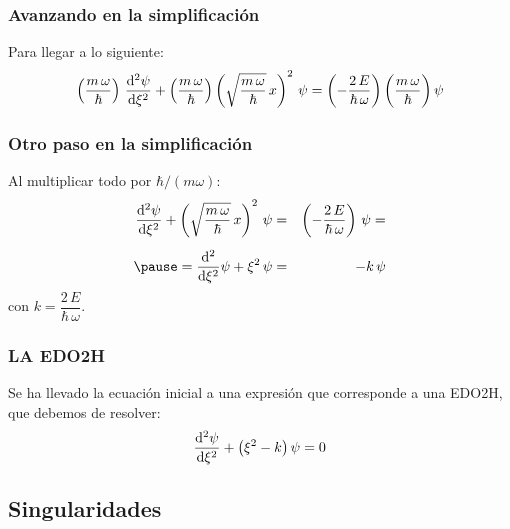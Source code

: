 \documentclass[12pt]{beamer}
\begin{document}
\begin{frame}
\frametitle{Avanzando en la simplificación}
Para llegar a lo siguiente:
\begin{align*}
\left( \dfrac{m \, \omega}{\hbar} \right) \, \dv[2]{\psi}{\xi} + \left( \dfrac{m \, \omega}{\hbar} \right) \left( \sqrt{\dfrac{m \, \omega}{\hbar}} \, x \right)^{2} \, \psi = \left( - \dfrac{2 \, E}{\hbar \, \omega} \right) \bigg( \dfrac{m \, \omega}{\hbar} \bigg) \, \psi
\end{align*}
\end{frame}
\begin{frame}
\frametitle{Otro paso en la simplificación}
Al multiplicar todo por $\hbar / (m \omega)$:
\pause
\begin{eqnarray*}
\dv[2]{\psi}{\xi} + \left( \sqrt{\dfrac{m \, \omega}{\hbar}} \, x \right)^{2} \, \psi &=& \left( - \dfrac{2 \, E}{\hbar \, \omega} \right) \, \psi = \\[0.5em] \pause
= \dv[2]{\xi} \psi + \xi^{2} \, \psi &=& - k \, \psi
\end{eqnarray*}
\pause
con $k = \dfrac{2 \, E}{\hbar \, \omega}$.
\end{frame}
\begin{frame}
\frametitle{LA EDO2H}
Se ha llevado la ecuación inicial a una expresión que corresponde a una EDO2H, que debemos de resolver:
\pause
\begin{align}
\dv[2]{\psi}{\xi} + \big( \xi^{2} - k \big) \, \psi = 0
\label{eq:ED_oscilador}
\end{align}
\end{frame}

\subsection{Singularidades}
\end{document}
